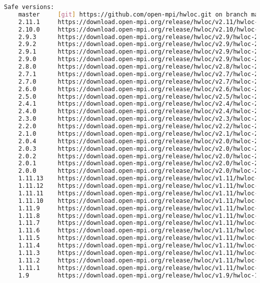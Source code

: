 {\begin{lstlisting}[language=bash]
Safe versions:  
    master     [git] https://github.com/open-mpi/hwloc.git on branch master
    2.11.1     https://download.open-mpi.org/release/hwloc/v2.11/hwloc-2.11.1.tar.gz
    2.10.0     https://download.open-mpi.org/release/hwloc/v2.10/hwloc-2.10.0.tar.gz
    2.9.3      https://download.open-mpi.org/release/hwloc/v2.9/hwloc-2.9.3.tar.gz
    2.9.2      https://download.open-mpi.org/release/hwloc/v2.9/hwloc-2.9.2.tar.gz
    2.9.1      https://download.open-mpi.org/release/hwloc/v2.9/hwloc-2.9.1.tar.gz
    2.9.0      https://download.open-mpi.org/release/hwloc/v2.9/hwloc-2.9.0.tar.gz
    2.8.0      https://download.open-mpi.org/release/hwloc/v2.8/hwloc-2.8.0.tar.gz
    2.7.1      https://download.open-mpi.org/release/hwloc/v2.7/hwloc-2.7.1.tar.gz
    2.7.0      https://download.open-mpi.org/release/hwloc/v2.7/hwloc-2.7.0.tar.gz
    2.6.0      https://download.open-mpi.org/release/hwloc/v2.6/hwloc-2.6.0.tar.gz
    2.5.0      https://download.open-mpi.org/release/hwloc/v2.5/hwloc-2.5.0.tar.gz
    2.4.1      https://download.open-mpi.org/release/hwloc/v2.4/hwloc-2.4.1.tar.gz
    2.4.0      https://download.open-mpi.org/release/hwloc/v2.4/hwloc-2.4.0.tar.gz
    2.3.0      https://download.open-mpi.org/release/hwloc/v2.3/hwloc-2.3.0.tar.gz
    2.2.0      https://download.open-mpi.org/release/hwloc/v2.2/hwloc-2.2.0.tar.gz
    2.1.0      https://download.open-mpi.org/release/hwloc/v2.1/hwloc-2.1.0.tar.gz
    2.0.4      https://download.open-mpi.org/release/hwloc/v2.0/hwloc-2.0.4.tar.gz
    2.0.3      https://download.open-mpi.org/release/hwloc/v2.0/hwloc-2.0.3.tar.gz
    2.0.2      https://download.open-mpi.org/release/hwloc/v2.0/hwloc-2.0.2.tar.gz
    2.0.1      https://download.open-mpi.org/release/hwloc/v2.0/hwloc-2.0.1.tar.gz
    2.0.0      https://download.open-mpi.org/release/hwloc/v2.0/hwloc-2.0.0.tar.gz
    1.11.13    https://download.open-mpi.org/release/hwloc/v1.11/hwloc-1.11.13.tar.gz
    1.11.12    https://download.open-mpi.org/release/hwloc/v1.11/hwloc-1.11.12.tar.gz
    1.11.11    https://download.open-mpi.org/release/hwloc/v1.11/hwloc-1.11.11.tar.gz
    1.11.10    https://download.open-mpi.org/release/hwloc/v1.11/hwloc-1.11.10.tar.gz
    1.11.9     https://download.open-mpi.org/release/hwloc/v1.11/hwloc-1.11.9.tar.gz
    1.11.8     https://download.open-mpi.org/release/hwloc/v1.11/hwloc-1.11.8.tar.gz
    1.11.7     https://download.open-mpi.org/release/hwloc/v1.11/hwloc-1.11.7.tar.gz
    1.11.6     https://download.open-mpi.org/release/hwloc/v1.11/hwloc-1.11.6.tar.gz
    1.11.5     https://download.open-mpi.org/release/hwloc/v1.11/hwloc-1.11.5.tar.gz
    1.11.4     https://download.open-mpi.org/release/hwloc/v1.11/hwloc-1.11.4.tar.gz
    1.11.3     https://download.open-mpi.org/release/hwloc/v1.11/hwloc-1.11.3.tar.gz
    1.11.2     https://download.open-mpi.org/release/hwloc/v1.11/hwloc-1.11.2.tar.gz
    1.11.1     https://download.open-mpi.org/release/hwloc/v1.11/hwloc-1.11.1.tar.gz
    1.9        https://download.open-mpi.org/release/hwloc/v1.9/hwloc-1.9.tar.gz


\end{lstlisting}}
